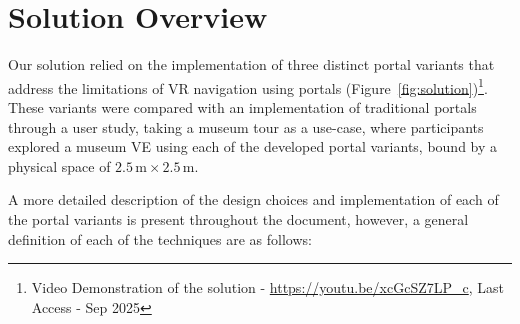 \section{Solution Overview}
\label{sec:solution-overview}

Our solution relied on the implementation of three distinct portal variants that address the limitations of \gls{VR} 
navigation using portals (Figure~\ref{fig:solution})\footnote{Video Demonstration of the solution - \url{https://youtu.be/xcGcSZ7LP_c}, Last Access - Sep 2025 }.
These variants were compared with an implementation of traditional portals through a user study, taking a museum tour as a use-case, 
where participants explored a museum \gls{VE} using each of the developed portal variants, bound by a physical space of 
$2.5\,\mathrm{m} \times 2.5\,\mathrm{m}$.

A more detailed description of the design choices and implementation of each of the portal variants is present throughout the document, however, a general 
definition of each of the techniques are as follows:

